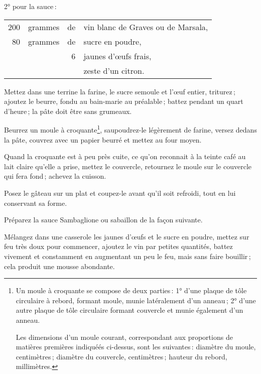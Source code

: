 2° pour la sauce :

\footnotesize
\begin{longtable}{rrrp{16em}}
    200 & grammes & de & vin blanc de Graves ou de Marsala,                                               \\
     80 & grammes & de & sucre en poudre,                                                                 \\
        &         &  6 & jaunes d'œufs frais,                                                             \\
        &         &    & zeste d'un citron.                                                               \\
\end{longtable}
\normalsize

Mettez dans une terrine la farine, le sucre semoule et l'œuf entier, triturez ;
ajoutez le beurre, fondu au bain-marie au préalable ; battez pendant un quart
d'heure ; la pâte doit être sans grumeaux.

Beurrez un moule à croquante\footnote{Un moule à croquante se compose de deux
parties : 1° d'une plaque de tôle circulaire à rebord, formant moule, munie
latéralement d'un anneau ; 2° d'une autre plaque de tôle circulaire formant
couvercle et munie également d'un anneau.
\protect

Les dimensions d'un moule courant, correspondant aux proportions de matières
premières indiquéés ci-dessus, sont les suivantes : diamètre du moule,
{\mmm} centimètres ; diamètre du couvercle, {\mmm} centimètres ;
hauteur du rebord, {\mmm} millimètres.}, saupoudrez-le légèrement de
farine, versez dedans la pâte, couvrez avec un papier beurré et mettez au four
moyen.

Quand la croquante est à peu près cuite, ce qu'on reconnait à la teinte café au
lait claire qu'elle a prise, mettez le couvercle, retournez le moule sur le
couvercle qui fera fond ; achevez la cuisson.

Posez le gâteau sur un plat et coupez-le avant qu'il soit refroidi, tout en lui
conservant sa forme.

\sk

Préparez la sauce Sambaglione ou sabaillon de la façon suivante.

Mélangez dans une casserole les jaunes d'œufs et le sucre en poudre, mettez
sur feu très doux pour commencer, ajoutez le vin par petites quantités, battez
vivement et constamment en augmentant un peu le feu, mais sans faire bouillir ;
cela produit une mousse abondante.

